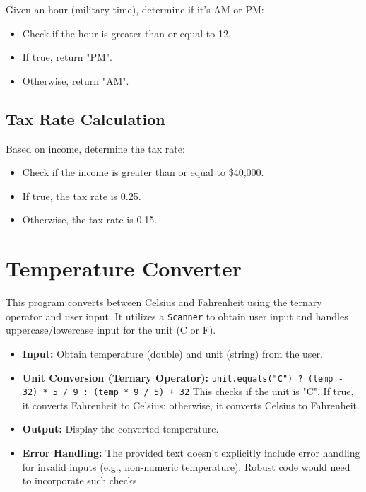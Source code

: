 \documentclass{article}
\begin{document}
Given an hour (military time), determine if it's AM or PM:

\begin{itemize}
    \item Check if the hour is greater than or equal to 12.
    \item If true, return "PM".
    \item Otherwise, return "AM".
\end{itemize}

\subsection{Tax Rate Calculation}

Based on income, determine the tax rate:

\begin{itemize}
    \item Check if the income is greater than or equal to \$40,000.
    \item If true, the tax rate is 0.25.
    \item Otherwise, the tax rate is 0.15.
\end{itemize}

\section{Temperature Converter}

This program converts between Celsius and Fahrenheit using the ternary operator and user input.  It utilizes a \texttt{Scanner} to obtain user input and handles uppercase/lowercase input for the unit (C or F).

\begin{itemize}
    \item \textbf{Input:} Obtain temperature (double) and unit (string) from the user.
    \item \textbf{Unit Conversion (Ternary Operator):}\newline
    \texttt{unit.equals("C") ? (temp - 32) * 5 / 9 : (temp * 9 / 5) + 32} \newline This checks if the unit is "C". If true, it converts Fahrenheit to Celsius; otherwise, it converts Celsius to Fahrenheit.
    \item \textbf{Output:} Display the converted temperature.
    \item \textbf{Error Handling:}  The provided text doesn't explicitly include error handling for invalid inputs (e.g., non-numeric temperature).  Robust code would need to incorporate such checks.
\end{itemize}
\end{document}
